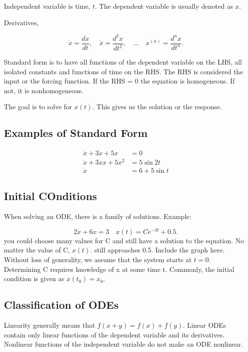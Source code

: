 \documentclass[12pt, a4paper]{report}
\begin{document}
  Independent variable is time, $ t. $ The dependent variable is usually denoted as $ x. $

  Derivatives,

  \[
      \dot{x} = \frac{dx}{dt}, \quad \ddot{x} = \frac{d^2 x}{dt^2},  \quad \ldots \quad x^{(n)} = \frac{d^n x}{dt^n}
    .\]

    Standard form is to have all functions of the dependent variable on the LHS, all isolated constants and functions of time on the RHS. The RHS is considered the input or the forcing function. If the RHS = 0 the equation is homogeneous. If not, it is nonhomogeneous.

    The goal is to solve for $ x(t). $ This gives us the solution or the response.

    \subsection{Examples of Standard Form}

    \begin{align}
      \ddot x + 3 \dot x + 5x &= 0 \\
      \ddot x + 3\dot x x +5 x ^2 &= 5 \sin{2t} \\
      \dot x &= 6 + 5 \sin t
    \end{align}

    \subsection{Initial COnditions}


    When solving an ODE, there is a family of solutions. Example:

    \[
        2 \dot x + 6x = 3 \quad x(t) = Ce^{-3t} + 0.5
      .\]
    you could choose many values for C and still have a solution to the equation. No matter the value of C, $ x(t). $ still approaches 0.5. Include the graph here. Without loss of generality, we assume that the system starts at $ t = 0. $ Determining C requires knowledge of x at some time t. Commonly, the initial condition is given as $ x(t_0) = x_0. $

    \subsection{Classification of ODEs}

    Linearity generally means that $ f(x + y) = f(x) + f(y). $ Linear ODEs contain only linear functions of the dependent variable and its derivatives. Nonlinear functions of the independent variable do not make an ODE nonlinear.
\end{document}
